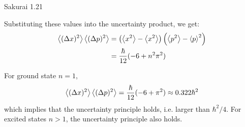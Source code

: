 \documentclass{article}
\begin{document}
\begin{section}{Sakurai 1.21}
\begin{tcolorbox}[breakable]
	Substituting these values into the uncertainty product, we get:
	\begin{align*}
		\left<(\Delta x)^2\right> \left<(\Delta p)^2\right> & = \left(\left<x^2\right> - \left<x^2\right>\right) \left(\left<p^2\right> - \left<p\right>^2\right) \\
		                                        & = \frac{\hbar}{12} (-6 + n^2 \pi^2)                                         \\
	\end{align*}

	For ground state $n=1$,
	\begin{align*}
		\left<(\Delta x)^2\right> \left<(\Delta p)^2\right> = \frac{\hbar}{12} (-6 + \pi^2) \approx 0.322 \hbar^2
	\end{align*}
	which implies that the uncertainty principle holds, i.e. larger than $\hbar^2/4$. For excited states $n > 1$, the uncertainty principle also holds.
\end{tcolorbox}
\end{section}
\end{document}
